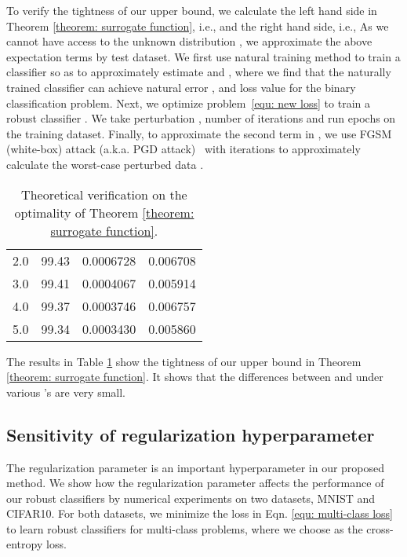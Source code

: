 \documentclass[11pt]{article}
\newcommand{\0}{\mathbf{0}}
\newcommand{\1}{\mathbf{1}}
\begin{document}
To verify the tightness of our upper bound, we calculate the left hand side in Theorem \ref{theorem: surrogate function}, i.e., \vspace{-0.2cm} \vspace{-0.2cm}
and the right hand side, i.e.,  
As we cannot have access to the unknown distribution , we approximate the above expectation terms by test dataset. We first use natural training method to train a classifier so as to approximately estimate 
 and , where we find that the naturally trained classifier can achieve natural error , and loss value  for the binary classification problem. Next,  we optimize problem~\eqref{equ: new loss} to train a robust classifier . We take perturbation , number of iterations  and run  epochs on the training dataset. Finally, to approximate the second term in , we use FGSM (white-box) attack (a.k.a. PGD attack)~\cite{kurakin2016adversarial} with  iterations to approximately calculate the worst-case perturbed data . 

\begin{table}
	\caption{Theoretical verification on the optimality of Theorem \ref{theorem: surrogate function}.}
	\label{table: theoretical upper bound tightness verification}
	\centering
\begin{tabular}{c|ccc}\hline
		 &    &  & 
		\\
		\hline
		2.0 & 99.43 & 0.0006728 & 0.006708\\
		3.0 & 99.41 & 0.0004067 & 0.005914\\
		4.0 & 99.37 & 0.0003746 & 0.006757\\
		5.0 & 99.34 & 0.0003430 & 0.005860\\
		\hline
	\end{tabular}
\end{table}
The results in Table \ref{table: theoretical upper bound tightness verification} show the tightness of our upper bound in Theorem \ref{theorem: surrogate function}. It shows that the differences between  and  under various 's are very small.

\vspace{-0.2cm}
\subsection{Sensitivity of regularization hyperparameter }
\vspace{-0.2cm}

The regularization parameter  is an important hyperparameter in our proposed method. We show how the regularization parameter affects the performance of our robust classifiers by numerical experiments on two datasets, MNIST and CIFAR10. For both datasets, we minimize the loss in Eqn. \eqref{equ: multi-class loss} to learn robust classifiers for multi-class problems, where we choose  as the cross-entropy loss. 
\end{document}
